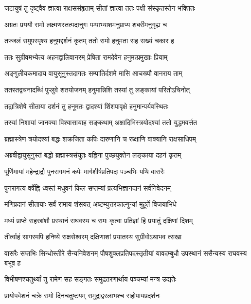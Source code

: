 \twolineshloka
{जटायुषं तु दृष्ट्वैव ज्ञात्वा राक्षससंहृताम्}
{सीतां ज्ञात्वा ततः पक्षी संस्कृतस्तेन भक्तितः}%

\twolineshloka
{अग्रतः प्रययौ रामो लक्ष्मणस्तत्पदानुगः}
{पम्पाभ्याशमनुप्राप्य शबरीमनुगृह्य च}%

\twolineshloka
{तज्जलं समुपस्पृश्य हनुमद्दर्शनं कृतम्}
{ततो रामो हनुमता सह सख्यं चकार ह}%

\twolineshloka
{ततः सुग्रीवमभ्येत्य अहनद्वालिवानरम्}
{प्रेषिता रामदेवेन हनुमत्प्रमुखाः प्रियाम्}%

\twolineshloka
{अङ्गुलीयकमादाय वायुसूनुस्तदागतः}
{सम्पातिर्दशमे मासि आचख्यौ वानराय ताम्}%

\twolineshloka
{ततस्तद्वचनादब्धिं पुप्लुवे शतयोजनम्}
{हनुमान्निशि तस्यां तु लङ्कायां परितोऽचिनोत्}%

\twolineshloka
{तद्रात्रिशेषे सीताया दर्शनं तु हनूमतः}
{द्वादश्यां शिंशपावृक्षे हनुमान्पर्यवस्थितः}%

\twolineshloka
{तस्यां निशायां जानक्या विश्वासायाह सङ्कथाम्}
{अक्षादिभिस्त्रयोदश्यां ततो युद्धमवर्त्तत}%

\twolineshloka
{ब्रह्मास्त्रेण त्रयोदश्यां बद्धः शक्रजिता कपिः}
{दारुणानि च रूक्षाणि वाक्यानि राक्षसाधिपम्}%

\twolineshloka
{अब्रवीद्वायुसूनुस्तं बद्धो ब्रह्मास्त्रसंयुतः}
{वह्निना पुच्छयुक्तेन लङ्काया दहनं कृतम्}%

\twolineshloka
{पूर्णिमायां महेन्द्राद्रौ पुनरागमनं कपेः}
{मार्गशीर्षप्रतिपदः पञ्चभिः पथि वासरैः}%

\twolineshloka
{पुनरागत्य वर्षेह्नि ध्वस्तं मधुवनं किल}
{सप्तम्यां प्रत्यभिज्ञानदानं सर्वनिवेदनम्}%

\twolineshloka
{मणिप्रदानं सीतायाः सर्वं रामाय शंसयत्}
{अष्टम्युत्तरफाल्गुन्यां मुहूर्ते विजयाभिधे}%

\twolineshloka
{मध्यं प्राप्ते सहस्रांशौ प्रस्थानं राघवस्य च}
{रामः कृत्वा प्रतिज्ञां हि प्रयातुं दक्षिणां दिशम्}%

\twolineshloka
{तीर्त्वाहं सागरमपि हनिष्ये राक्षसेश्वरम्}
{दक्षिणाशां प्रयातस्य सुग्रीवोऽथाभव त्सखा}%

\threelineshloka
{वासरैः सप्तभिः सिन्धोस्तीरे सैन्यनिवेशनम्}
{पौषशुक्लप्रतिपदस्तृतीयां यावदम्बुधौ}
{उपस्थानं ससैन्यस्य राघवस्य बभूव ह}%

\twolineshloka
{विभीषणश्चतुर्थ्यां तु रामेण सह सङ्गतः}
{समुद्रतरणार्थाय पञ्चम्यां मन्त्र उद्यतेः}%

\twolineshloka
{प्रायोपवेशनं चक्रे रामो दिनचतुष्टयम्}
{समुद्राद्वरलाभश्च सहोपायप्रदर्शनः}%

